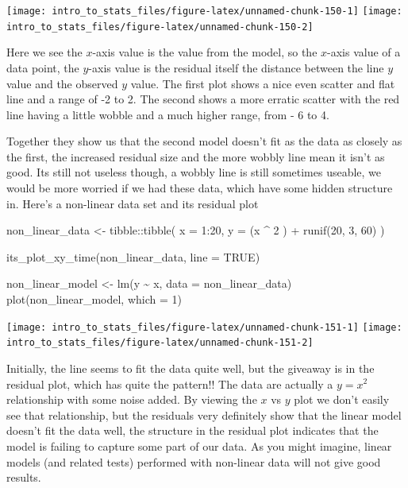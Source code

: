 \documentclass[
]{book}
\newenvironment{Shaded}{\begin{snugshade}}{\end{snugshade}}
\newcommand{\AttributeTok}[1]{\textcolor[rgb]{0.77,0.63,0.00}{#1}}
\newcommand{\ConstantTok}[1]{\textcolor[rgb]{0.00,0.00,0.00}{#1}}
\newcommand{\DecValTok}[1]{\textcolor[rgb]{0.00,0.00,0.81}{#1}}
\newcommand{\FunctionTok}[1]{\textcolor[rgb]{0.00,0.00,0.00}{#1}}
\newcommand{\NormalTok}[1]{#1}
\newcommand{\OtherTok}[1]{\textcolor[rgb]{0.56,0.35,0.01}{#1}}
\newcommand{\SpecialCharTok}[1]{\textcolor[rgb]{0.00,0.00,0.00}{#1}}
\begin{document}
\texttt{[image: intro\_to\_stats\_files/figure-latex/unnamed-chunk-150-1]} \texttt{[image: intro\_to\_stats\_files/figure-latex/unnamed-chunk-150-2]}

Here we see the \(x\)-axis value is the value from the model, so the \(x\)-axis value of a data point, the \(y\)-axis value is the residual itself the distance between the line \(y\) value and the observed \(y\) value. The first plot shows a nice even scatter and flat line and a range of -2 to 2. The second shows a more erratic scatter with the red line having a little wobble and a much higher range, from - 6 to 4.

Together they show us that the second model doesn't fit as the data as closely as the first, the increased residual size and the more wobbly line mean it isn't as good. Its still not useless though, a wobbly line is still sometimes useable, we would be more worried if we had these data, which have some hidden structure in. Here's a non-linear data set and its residual plot

\begin{Shaded}
\begin{Highlighting}[]
\NormalTok{non\_linear\_data }\OtherTok{\textless{}{-}}\NormalTok{ tibble}\SpecialCharTok{::}\FunctionTok{tibble}\NormalTok{(}
  \AttributeTok{x =} \DecValTok{1}\SpecialCharTok{:}\DecValTok{20}\NormalTok{,}
  \AttributeTok{y =}\NormalTok{ (x }\SpecialCharTok{\^{}} \DecValTok{2}\NormalTok{ ) }\SpecialCharTok{+} \FunctionTok{runif}\NormalTok{(}\DecValTok{20}\NormalTok{, }\DecValTok{3}\NormalTok{, }\DecValTok{60}\NormalTok{)}
\NormalTok{)}

\FunctionTok{its\_plot\_xy\_time}\NormalTok{(non\_linear\_data, }\AttributeTok{line =} \ConstantTok{TRUE}\NormalTok{)}

\NormalTok{non\_linear\_model }\OtherTok{\textless{}{-}} \FunctionTok{lm}\NormalTok{(y }\SpecialCharTok{\textasciitilde{}}\NormalTok{ x, }\AttributeTok{data =}\NormalTok{ non\_linear\_data)}
\FunctionTok{plot}\NormalTok{(non\_linear\_model, }\AttributeTok{which =} \DecValTok{1}\NormalTok{)}
\end{Highlighting}
\end{Shaded}

\texttt{[image: intro\_to\_stats\_files/figure-latex/unnamed-chunk-151-1]} \texttt{[image: intro\_to\_stats\_files/figure-latex/unnamed-chunk-151-2]}

Initially, the line seems to fit the data quite well, but the giveaway is in the residual plot, which has quite the pattern!! The data are actually a \(y = x^2\) relationship with some noise added. By viewing the \(x\) vs \(y\) plot we don't easily see that relationship, but the residuals very definitely show that the linear model doesn't fit the data well, the structure in the residual plot indicates that the model is failing to capture some part of our data. As you might imagine, linear models (and related tests) performed with non-linear data will not give good results.
\end{document}
